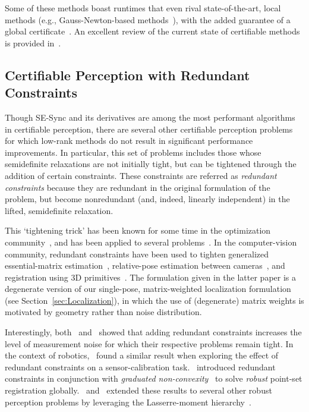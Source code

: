 \documentclass[lettersize,journal]{IEEEtran}
\begin{document}
Some of these methods boast runtimes that even rival state-of-the-art, local methods (e.g., Gauss-Newton-based methods~\cite{gtsam}), with the added guarantee of a global certificate~\cite{juricComparisonGraphOptimization2021, brialesCartanSyncFastGlobal2017}. An excellent review of the current state of certifiable methods is provided in~\cite{rosenAdvancesInferenceRepresentation2021}.

\subsection{Certifiable Perception with Redundant Constraints}\label{sec:RedundantConstraints}

Though SE-Sync and its derivatives are among the most performant algorithms in certifiable perception, there are several other certifiable perception problems for which low-rank methods do not result in significant performance improvements. In particular, this set of problems includes those whose semidefinite relaxations are not initially tight, but can be tightened through the addition of certain constraints. These constraints are referred as \emph{redundant constraints} because they are redundant in the original formulation of the problem, but become nonredundant (and, indeed, linearly independent) in the lifted, semidefinite relaxation.

This `tightening trick' has been known for some time in the optimization community~\cite{nesterovSemidefiniteProgrammingRelaxations2000}, and has been applied to several problems~\cite{ruizUsingRedundancyStrengthen2011, parriloSemidefiniteProgrammingRelaxations2003a}. In the computer-vision community, redundant constraints have been used to tighten generalized essential-matrix estimation~\cite{zhaoCertifiablyGloballyOptimal2020}, relative-pose estimation between cameras~\cite{garcia-salgueroTighterRelaxationRelative2022, brialesCertifiablyGloballyOptimal2018}, and registration using 3D primitives~\cite{brialesConvexGlobal3D2017}. The formulation given in the latter paper is a degenerate version of our single-pose, matrix-weighted localization formulation (see Section~\ref{sec:Localization}), in which the use of (degenerate) matrix weights is motivated by geometry rather than noise distribution. 

Interestingly, both~\cite{garcia-salgueroTighterRelaxationRelative2022} and~\cite{brialesCertifiablyGloballyOptimal2018} showed that adding redundant constraints increases the level of measurement noise for which their respective problems remain tight. In the context of robotics,~\cite{wiseCertifiablyOptimalMonocular2020} found a similar result when exploring the effect of redundant constraints on a sensor-calibration task.~\cite{yangTEASERFastCertifiable2021} introduced redundant constraints in conjunction with \emph{graduated non-convexity}~\cite{yangGraduatedNonConvexityRobust2020} to solve \emph{robust} point-set registration globally.~\cite{yangOneRingRule2020} and~\cite{yangCertifiablyOptimalOutlierRobust2023} extended these results to several other robust perception problems by leveraging the Lasserre-moment hierarchy~\cite{henrionMomentSOSHierarchyLectures2021,lasserreGlobalOptimizationPolynomials2001}. 
\end{document}
